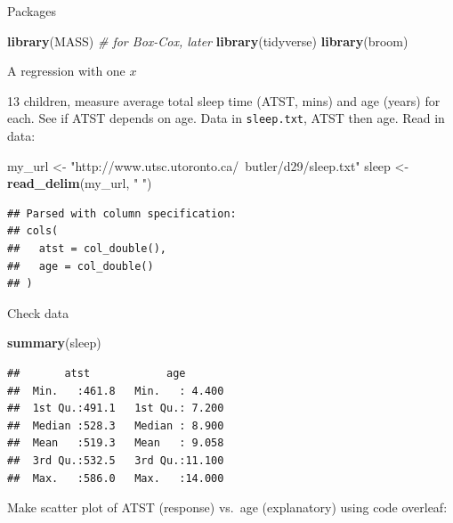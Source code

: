 \documentclass[ignorenonframetext,]{beamer}
\newenvironment{Shaded}{\begin{snugshade}}{\end{snugshade}}
\newcommand{\CommentTok}[1]{\textcolor[rgb]{0.56,0.35,0.01}{\textit{#1}}}
\newcommand{\KeywordTok}[1]{\textcolor[rgb]{0.13,0.29,0.53}{\textbf{#1}}}
\newcommand{\NormalTok}[1]{#1}
\newcommand{\StringTok}[1]{\textcolor[rgb]{0.31,0.60,0.02}{#1}}
\begin{document}
\begin{frame}[fragile]{Packages}
\protect\hypertarget{packages}{}

\begin{Shaded}
\begin{Highlighting}[]
\KeywordTok{library}\NormalTok{(MASS) }\CommentTok{# for Box-Cox, later}
\KeywordTok{library}\NormalTok{(tidyverse)}
\KeywordTok{library}\NormalTok{(broom)}
\end{Highlighting}
\end{Shaded}

\end{frame}

\begin{frame}[fragile]{A regression with one \(x\)}
\protect\hypertarget{a-regression-with-one-x}{}

13 children, measure average total sleep time (ATST, mins) and age
(years) for each. See if ATST depends on age. Data in
\texttt{sleep.txt}, ATST then age. Read in data:

\begin{Shaded}
\begin{Highlighting}[]
\NormalTok{my_url <-}\StringTok{ "http://www.utsc.utoronto.ca/~butler/d29/sleep.txt"}
\NormalTok{sleep <-}\StringTok{ }\KeywordTok{read_delim}\NormalTok{(my_url, }\StringTok{" "}\NormalTok{)}
\end{Highlighting}
\end{Shaded}

\begin{verbatim}
## Parsed with column specification:
## cols(
##   atst = col_double(),
##   age = col_double()
## )
\end{verbatim}

\end{frame}

\begin{frame}[fragile]{Check data}
\protect\hypertarget{check-data}{}

\begin{Shaded}
\begin{Highlighting}[]
\KeywordTok{summary}\NormalTok{(sleep)}
\end{Highlighting}
\end{Shaded}

\begin{verbatim}
##       atst            age        
##  Min.   :461.8   Min.   : 4.400  
##  1st Qu.:491.1   1st Qu.: 7.200  
##  Median :528.3   Median : 8.900  
##  Mean   :519.3   Mean   : 9.058  
##  3rd Qu.:532.5   3rd Qu.:11.100  
##  Max.   :586.0   Max.   :14.000
\end{verbatim}

Make scatter plot of ATST (response) vs.~age (explanatory) using code
overleaf:

\end{frame}
\end{document}
